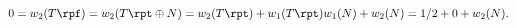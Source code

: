 \begin{equation}
0=w_2(T\rpf)=w_2(T\rpt\oplus N)=w_2(T\rpt)+w_1(T\rpt)w_1(N)+w_2(N)=1/2+0+w_2(N).
\end{equation}

